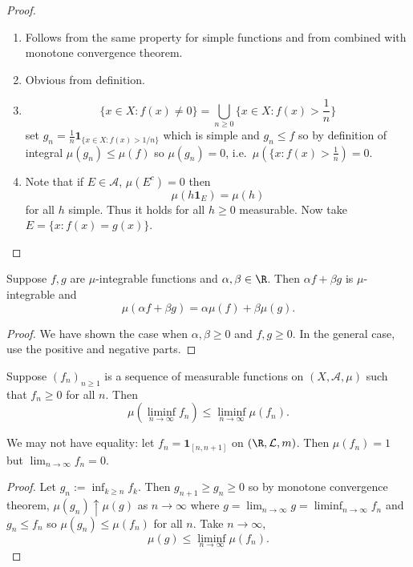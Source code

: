 \documentclass[a4paper]{article}
\begin{document}
\begin{proof}\leavevmode
  \begin{enumerate}
  \item Follows from the same property for simple functions and from  combined with monotone convergence theorem.
  \item Obvious from definition.
  \item
    \[
      \{x \in X: f(x) \neq 0\} = \bigcup_{n \geq 0} \{x \in X: f(x) > \frac{1}{n}\}
    \]
    set \(g_n = \frac{1}{n} \mathbf 1_{\{x \in X: f(x) > 1/n\}}\) which is simple and \(g_n \leq f\) so by definition of integral \(\mu(g_n) \leq \mu(f)\) so \(\mu(g_n) = 0\), i.e.\ \(\mu(\{x: f(x) > \frac{1}{n}) = 0\).
  \item Note that if \(E \in \mathcal A\), \(\mu(E^c) = 0\) then
    \[
      \mu(h \mathbf 1_E) = \mu(h)
    \]
    for all \(h\) simple. Thus it holds for all \(h \geq 0\) measurable. Now take \(E = \{x: f(x) = g(x)\}\).
  \end{enumerate}
\end{proof}

\begin{proposition}
  Suppose \(f, g\) are \(\mu\)-integrable functions and \(\alpha, \beta \in \R\). Then \(\alpha f + \beta g\) is \(\mu\)-integrable and
  \[
    \mu(\alpha f + \beta g) = \alpha \mu(f) + \beta \mu(g).
  \]
\end{proposition}

\begin{proof}
  We have shown the case when \(\alpha, \beta \geq 0\) and \(f, g \geq 0\). In the general case, use the positive and negative parts.
\end{proof}

\begin{lemma}
  Suppose \((f_n)_{n \geq 1}\) is a sequence of measurable functions on \((X, \mathcal A, \mu)\) such that \(f_n \geq 0\) for all \(n\). Then
  \[
    \mu(\liminf_{n \to \infty} f_n) \leq \liminf_{n \to \infty} \mu(f_n).
  \]
\end{lemma}

\begin{remark}
  We may not have equality: let \(f_n = \mathbf 1_{[n, n + 1]}\) on \((\R, \mathcal L, m)\). Then \(\mu(f_n) = 1\) but \(\lim_{n \to \infty} f_n = 0\).
\end{remark}

\begin{proof}
  Let \(g_n := \inf_{k \geq n} f_k\). Then \(g_{n + 1} \geq g_n \geq 0\) so by monotone convergence theorem, \(\mu(g_n) \uparrow \mu(g)\) as \(n \to \infty\) where \(g = \lim_{n \to \infty} g = \liminf_{n \to \infty} f_n\) and \(g_n \leq f_n\) so \(\mu(g_n) \leq \mu(f_n)\) for all \(n\). Take \(n \to \infty\),
  \[
    \mu(g) \leq \liminf_{n \to \infty} \mu(f_n).
  \]
\end{proof}
\end{document}
